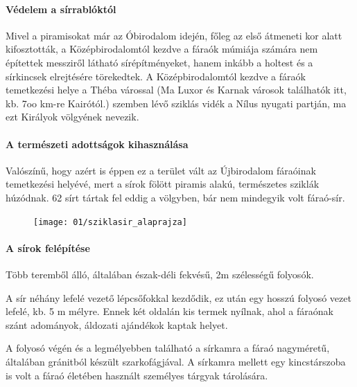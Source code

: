 \paragraph{Védelem a sírrablóktól} Mivel a piramisokat már az Óbirodalom idején, főleg az első átmeneti kor alatt kifosztották, a Középbirodalomtól kezdve a fáraók múmiája számára nem építettek messziről látható sírépítményeket, hanem inkább a holtest és a sírkincsek elrejtésére törekedtek. A Középbirodalomtól kezdve a fáraók temetkezési helye a Théba várossal (Ma Luxor és Karnak városok találhatók itt, kb. 7oo km-re Kairótól.) szemben lévő sziklás vidék a Nílus nyugati partján, ma ezt Királyok völgyének nevezik.

\paragraph{A természeti adottságok kihasználása}Valószínű, hogy azért is éppen ez a terület vált az Újbirodalom fáraóinak temetkezési helyévé, mert a sírok fölött piramis alakú, természetes sziklák húzódnak. 62 sírt tártak fel eddig a völgyben, bár nem mindegyik volt fáraó-sír.

\begin{figure}
	\begin{tcolorbox}[enhanced,colframe=gray!50!white,
		colbacktitle=white!15!white,
		coltitle=gray!50!black,
		borderline={0.5mm}{0mm}{gray!15!white},
		borderline={0.5mm}{0mm}{gray!50!white,dashed},
		attach boxed title to top center={yshift=-2mm},
		boxed title style={boxrule=0.4pt},
		title=Sziklasír felépítése]{
			\texttt{[image: 01/sziklasir\_alaprajza]}}
	\end{tcolorbox}
\end{figure}

\paragraph{A sírok felépítése} Több teremből álló, általában észak-déli fekvésű, 2m szélességű folyosók.

A sír néhány lefelé vezető lépcsőfokkal kezdődik, ez után egy hosszú folyosó vezet lefelé, kb. 5 m mélyre. Ennek két oldalán kis termek nyílnak, ahol a fáraónak szánt adományok, áldozati ajándékok kaptak helyet. 

A folyosó végén és a legmélyebben található a sírkamra a fáraó nagyméretű, általában gránitból készült szarkofágjával. A sírkamra mellett egy kincstárszoba is volt a fáraó életében használt személyes tárgyak tárolására.

